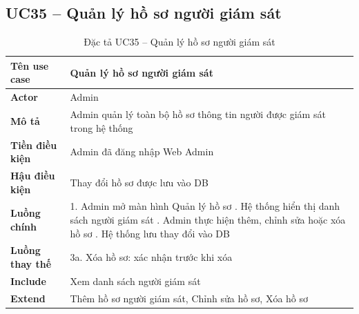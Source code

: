 \subsection*{UC35 -- Quản lý hồ sơ người giám sát}
\begin{table}[H]
    \captionsetup{justification=raggedright, singlelinecheck=false}
    \caption{Đặc tả UC35 -- Quản lý hồ sơ người giám sát}
\centering
\begin{tabular}{|p{3.5cm}|p{10cm}|}
\hline
\textbf{Tên use case} & Quản lý hồ sơ người giám sát \\
\hline
\textbf{Actor} & Admin \\
\hline
\textbf{Mô tả} & Admin quản lý toàn bộ hồ sơ thông tin
  người được giám sát trong hệ thống \\
\hline
\textbf{Tiền điều kiện} & Admin đã đăng nhập Web Admin \\
\hline
\textbf{Hậu điều kiện} & Thay đổi hồ sơ được lưu vào DB \\
\hline
\textbf{Luồng chính} &
  1. Admin mở màn hình Quản lý hồ sơ \newline
  2. Hệ thống hiển thị danh sách người giám sát \newline
  3. Admin thực hiện thêm, chỉnh sửa hoặc xóa hồ sơ \newline
  4. Hệ thống lưu thay đổi vào DB \\
\hline
\textbf{Luồng thay thế} &
  3a. Xóa hồ sơ: xác nhận trước khi xóa \\
\hline
\textbf{Include} & Xem danh sách người giám sát \\
\hline
\textbf{Extend} & Thêm hồ sơ người giám sát,
  Chỉnh sửa hồ sơ, Xóa hồ sơ \\
\hline
\end{tabular}

\end{table}

